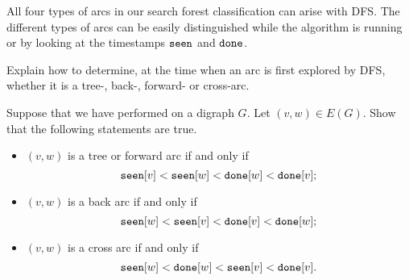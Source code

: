 All four types of arcs in our search forest classification can
arise with DFS. The different types of arcs can be easily
distinguished while the algorithm is running or by looking at the timestamps 
$\seen$ and $\done$.

\begin{Boxample}[3]
Explain how to determine, at the time when an arc is first explored by
DFS, whether it is a tree-, back-, forward- or cross-arc.
\end{Boxample}

\begin{Boxample}[3]
Suppose that we have performed  on a digraph $G$. Let $(v, w)\in
E(G)$. Show that the following statements are true.
\begin{itemize}
\item
$(v, w)$ is a tree or forward arc if and only if  
$$\seen[v] < \seen[w] < \done[w] < \done[v];$$
\item
$(v, w)$ is a back arc if and only if
$$\seen[w] <  \seen[v] < \done[v] < \done[w];$$ 
\item
$(v, w)$ is a cross arc if and only if 
$$\seen[w] < \done[w]  < \seen[v] < \done[v].$$
\end{itemize}
\end{Boxample}



